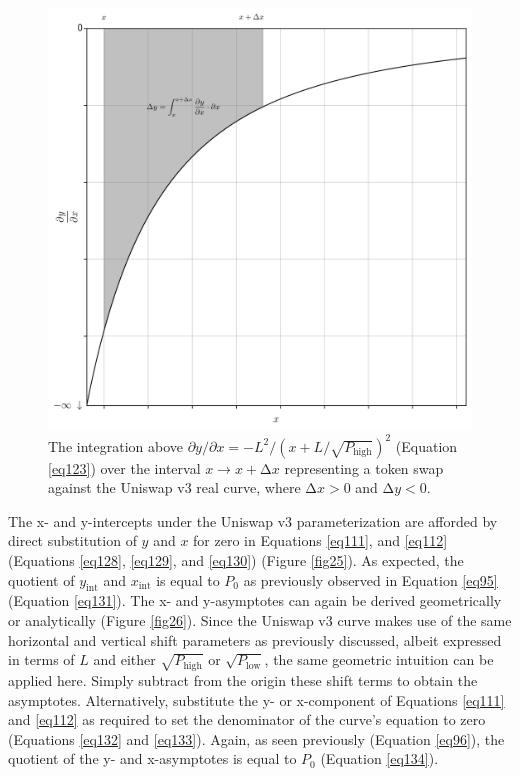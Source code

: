 \documentclass{article}
\begin{document}
\begin{figure}[ht]
    \centering
    \includegraphics[width=\textwidth]{fig24.png}
    \captionsetup{
        justification=raggedright,
        singlelinecheck=false,
        font=small,
        labelfont=bf,
        labelsep=quad,
        format=plain
    }
    \caption{The integration above $\partial y / \partial x = - L^{2} / \left( x + L / \sqrt{P_{\text{high}}} \right)^{2}$ (Equation \ref{eq123}) over the interval $x \rightarrow x + \mathrm{\Delta}x$ representing a token swap against the Uniswap v3 real curve, where $\mathrm{\Delta}x > 0$ and $\mathrm{\Delta}y < 0$.}
    \label{fig24}
\end{figure}

The x- and y-intercepts under the Uniswap v3 parameterization are afforded by direct substitution of $y$ and $x$ for zero in Equations \ref{eq111}, and \ref{eq112} (Equations \ref{eq128}, \ref{eq129}, and \ref{eq130}) (Figure \ref{fig25}). As expected, the quotient of $y_{\text{int}}$ and $x_{\text{int}}$ is equal to $P_{0}$ as previously observed in Equation \ref{eq95} (Equation \ref{eq131}). The x- and y-asymptotes can again be derived geometrically or analytically (Figure \ref{fig26}). Since the Uniswap v3 curve makes use of the same horizontal and vertical shift parameters as previously discussed, albeit expressed in terms of $L$ and either $\sqrt{P_{\text{high}}}$ or $\sqrt{P_{\text{low}}}$, the same geometric intuition can be applied here. Simply subtract from the origin these shift terms to obtain the asymptotes. Alternatively, substitute the y- or x-component of Equations \ref{eq111} and \ref{eq112} as required to set the denominator of the curve's equation to zero (Equations \ref{eq132} and \ref{eq133}). Again, as seen previously (Equation \ref{eq96}), the quotient of the y- and x-asymptotes is equal to $P_{0}$ (Equation \ref{eq134}). 
\end{document}
